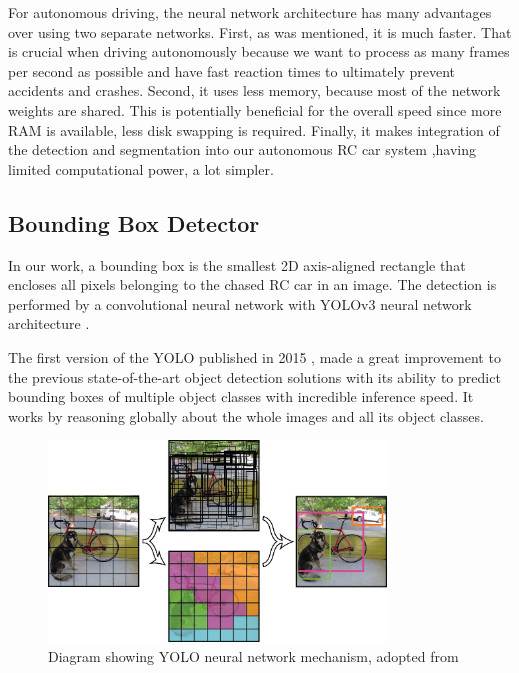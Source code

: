 \documentclass{ctuthesis/ctuthesis}
\begin{document}
For autonomous driving, the neural network architecture has many advantages over using two separate networks. First, as was mentioned, it is much faster. That is crucial when driving autonomously because we want to process as many frames per second as possible and have fast reaction times to ultimately prevent accidents and crashes. Second, it uses less memory, because most of the network weights are shared. This is potentially beneficial for the overall speed since more RAM is available, less disk swapping is required. Finally, it makes integration of the detection and segmentation into our autonomous RC car system ,having limited computational power, a lot simpler.




\subsection{Bounding Box Detector}
In our work, a bounding box is the smallest 2D axis-aligned rectangle that encloses all pixels belonging to the chased RC car in an image. The detection is performed by a convolutional neural network \cite{CNN_Lecun} with YOLOv3 neural network architecture \cite{YOLOv3}. \par 
The first version of the YOLO published in 2015 \cite{YOLO}, made a great improvement to the previous state-of-the-art object detection solutions with its ability to predict bounding boxes of multiple object classes with incredible inference speed. It works by reasoning globally about the whole images and all its object classes. \par


\begin{figure}[h!]
    \centering
    \includegraphics[width=0.8\textwidth]{images/YOLO.png}
    
    \caption[Diagram showing YOLO neural network mechanism]{Diagram showing YOLO neural network mechanism, adopted from \protect\cite{YOLO}}\label{f:YOLO}
\end{figure}
\end{document}
